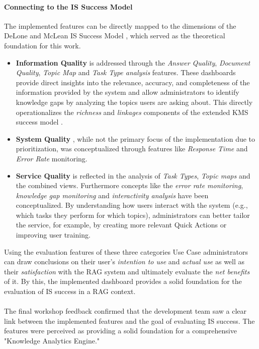 \documentclass[
	english,
	ruledheaders=section,%
	class=report,%
	thesis={type=bachelor},%
	accentcolor=1b,%
	custommargins=true,%
	marginpar=false,%
	parskip=half-,%
	fontsize=11pt,%
	DIV=14,
]{tudapub}
\begin{document}
\paragraph{Connecting to the IS Success Model} The implemented features can be directly mapped to the dimensions of the DeLone and McLean IS Success Model \parencite{DeloneMcLean2003ISSuccessTenYearUpdate}, which served as the theoretical foundation for this work.
\begin{itemize}
    \item \textbf{Information Quality} is addressed through the \textit{Answer Quality}, \textit{Document Quality}, \textit{Topic Map} and \textit{Task Type analysis} features. These dashboards provide direct insights into the relevance, accuracy, and completeness of the information provided by the system and allow administrators to identify knowledge gaps by analyzing the topics users are asking about. This directly operationalizes the \textit{richness} and \textit{linkages} components of the extended KMS success model \parencite[pp.~57--58]{Jennex2006}.
    \item \textbf{System Quality} \parencite[p.~64]{DeloneMcLean1992ISSuccess}, while not the primary focus of the implementation due to prioritization, was conceptualized through features like \textit{Response Time} and \textit{Error Rate} monitoring.
    \item \textbf{Service Quality} is reflected in the analysis of \textit{Task Types}, \textit{Topic maps} and the combined views. Furthermore concepts like the \textit{error rate monitoring}, \textit{knowledge gap monitoring} and \textit{interactivity analysis} have been conceptualized. By understanding how users interact with the system (e.g., which tasks they perform for which topics), administrators can better tailor the service, for example, by creating more relevant Quick Actions or improving user training.
\end{itemize}
Using the evaluation features of these three categories Use Case administrators can draw conclusions on their user's \textit{intention to use} and \textit{actual use}  as well as their \textit{satisfaction} with the RAG system and ultimately evaluate the \textit{net benefits} of it. By this, the implemented dashboard provides a solid foundation for the evaluation of IS success in a RAG context.\\
\\
The final workshop feedback confirmed that the development team saw a clear link between the implemented features and the goal of evaluating IS success. The features were perceived as providing a solid foundation for a comprehensive "Knowledge Analytics Engine."
\end{document}
